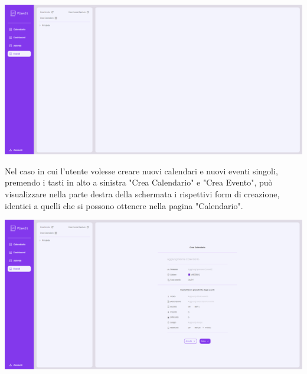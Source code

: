 \begin{center}
    \includegraphics[width=1\textwidth, height=0.3\textheight]{img/png/FrontEnd/Eventi/schermataEventi.png}
\end{center}

Nel caso in cui l'utente volesse creare nuovi calendari e nuovi eventi singoli, premendo i tasti in alto a sinistra "Crea Calendario" e "Crea Evento", può visualizzare nella parte destra della schermata i rispettivi form di creazione, identici a quelli che si possono ottenere nella pagina "Calendario".

\begin{center}
    \includegraphics[width=1\textwidth, height=0.3\textheight]{img/png/FrontEnd/Eventi/EventiCreaCalendario.png}
\end{center}

